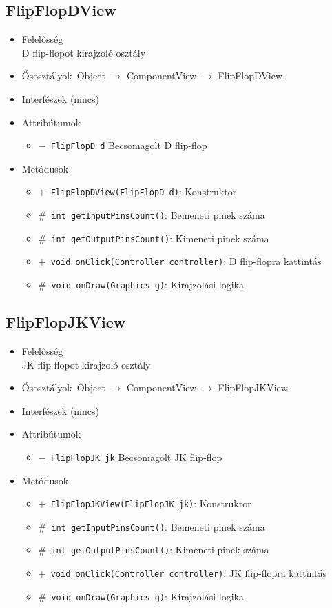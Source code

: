 \subsection{FlipFlopDView}
\begin{itemize}
\item Felelősség\\
D flip-flopot kirajzoló osztály
\item Ősosztályok\ Object $\rightarrow{}$ ComponentView $\rightarrow{}$ FlipFlopDView.
\item Interfészek (nincs)
\item Attribútumok $\ $
\begin{itemize}
	\item[] \texttt{$-$ FlipFlopD d} Becsomagolt D flip-flop
\end{itemize}
\item Metódusok$\ $
\begin{itemize}
	\item[] \texttt{$+$ FlipFlopDView(FlipFlopD d)}: Konstruktor
	\item[] \texttt{$\#$ int getInputPinsCount()}: Bemeneti pinek száma
	\item[] \texttt{$\#$ int getOutputPinsCount()}: Kimeneti pinek száma
	\item[] \texttt{$+$ void onClick(Controller controller)}: D flip-flopra kattintás
	\item[] \texttt{$\#$ void onDraw(Graphics g)}: Kirajzolási logika
\end{itemize}
\end{itemize}

\subsection{FlipFlopJKView}
\begin{itemize}
\item Felelősség\\
JK flip-flopot kirajzoló osztály
\item Ősosztályok\ Object $\rightarrow{}$ ComponentView $\rightarrow{}$ FlipFlopJKView.
\item Interfészek (nincs)
\item Attribútumok $\ $
\begin{itemize}
	\item[] \texttt{$-$ FlipFlopJK jk} Becsomagolt JK flip-flop
\end{itemize}
\item Metódusok$\ $
\begin{itemize}
	\item[] \texttt{$+$ FlipFlopJKView(FlipFlopJK jk)}: Konstruktor
	\item[] \texttt{$\#$ int getInputPinsCount()}: Bemeneti pinek száma
	\item[] \texttt{$\#$ int getOutputPinsCount()}: Kimeneti pinek száma
	\item[] \texttt{$+$ void onClick(Controller controller)}: JK flip-flopra kattintás
	\item[] \texttt{$\#$ void onDraw(Graphics g)}: Kirajzolási logika
\end{itemize}
\end{itemize}

